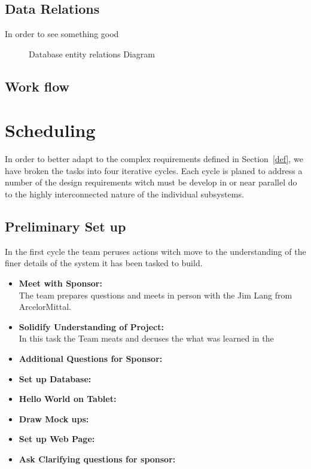 \documentclass[Letter,11pt]{article}
\begin{document}
	\subsection{Data Relations}
		In order to see something good
		\begin{figure}[h]
			\centering
			
			\caption{\label{ERdiogram} Database entity relations Diagram}
		\end{figure}
		
	\subsection{Work flow}
		
	
\section{Scheduling}
		In order to better adapt to the complex requirements defined in Section~\ref{def}, we have broken the tasks into four iterative cycles. Each cycle is planed to address a number of the design requirements witch must be develop in or near parallel do to the highly interconnected nature of the individual subsystems. 
		
		
	\subsection{Preliminary Set up}\label{cyc1}
		In the first cycle the team peruses actions witch move to the understanding of the finer details of the system it has been tasked to build.
		
		\begin{itemize}
			\item\textbf{Meet with Sponsor:}\\
			The team prepares questions and meets in person with the Jim Lang from ArcelorMittal.
			
			\item \textbf{Solidify Understanding of Project:}\\
			In this task the Team meats and decuses the what was learned in the 
			
			\item\textbf{Additional Questions for Sponsor:}\\
			
			\item\textbf{Set up Database:}\\
			
			\item\textbf{Hello World on Tablet:}\\
			
			\item\textbf{Draw Mock ups:}\\
			
			\item\textbf{Set up Web Page:}\\
			
			\item\textbf{Ask Clarifying questions for sponsor:}\\
			
		\end{itemize}
		
\end{document}
